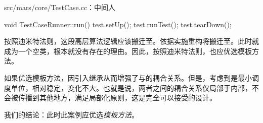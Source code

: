 \begin{content}
\begin{nodiff}{src/mars/core/TestCase.cc：中间人}
\begin{c++}
void TestCaseRunner::run() {
  test.setUp();
  test.runTest();
  test.tearDown();
}
\end{c++}
\end{nodiff}

按照迪米特法则，这段高层算法逻辑应该搬迁至。依据实施重构将搬迁至。此时就成为一个空类，根本就没有存在的理由。因此，按照迪米特法则，也应优选模板方法。

如果优选模板方法，因引入继承从而增强了与的耦合关系。但是，考虑到是最小调度单位，相对稳定，变化不大。也就是说，两者之间的耦合关系仅局部于内部，不会被传播到其他地方，满足局部化原则，这是完全可以接受的设计。

我们的结论：此时此案例应优选\emph{模板方法}。

\end{content}
